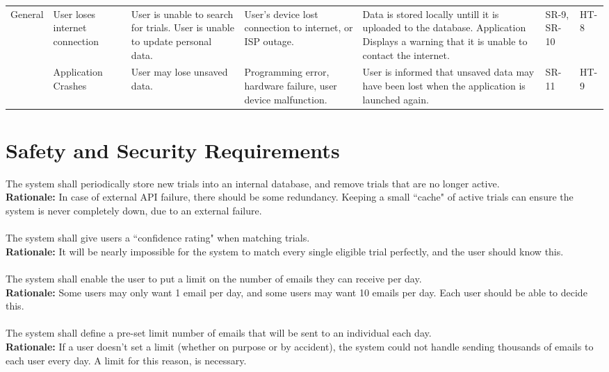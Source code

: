 \documentclass{article}
\begin{document}
\begin{table}[H]
{\begin{tabular}{|p{3cm}|p{3cm}p{3cm}p{3cm}p{3cm}p{3cm}p{3cm}|}
    \hline
  General  & User loses internet connection & User is unable to search for trials. User is unable to update personal data. & User's device lost connection to internet, or ISP outage.& Data is stored locally untill it is uploaded to the database. Application Displays a warning that it is unable to contact the internet. &  SR-9, SR-10 & HT-8 \\\cline{2-7}
  & Application Crashes & User may lose unsaved data. & Programming error, hardware failure, user device malfunction. & User is informed that unsaved data may have been lost when the application is launched again. &  SR-11 & HT-9 \\
    \hline
    \end{tabular}}
\end{table}


\section{Safety and Security Requirements}

The system shall periodically store new trials into an internal database, and remove trials that are no longer active.\\
\textbf{Rationale:} 
In case of external API failure, there should be some redundancy. Keeping a small ``cache" of active trials can ensure the system is never
completely down, due to an external failure.\\~\\

The system shall give users a ``confidence rating" when matching trials.\\
\textbf{Rationale:} 
It will be nearly impossible for the system to match every single eligible trial perfectly, and the user should know this.\\~\\

The system shall enable the user to put a limit on the number of emails they can receive per day.\\
\textbf{Rationale:}
Some users may only want 1 email per day, and some users may want 10 emails per day. Each user should be able to decide this.\\~\\

The system shall define a pre-set limit number of emails that will be sent to an individual each day.\\
\textbf{Rationale:}
If a user doesn't set a limit (whether on purpose or by accident), the system could not handle sending thousands of emails to each user every day. A limit for this reason, is necessary.\\~\\
\end{document}

